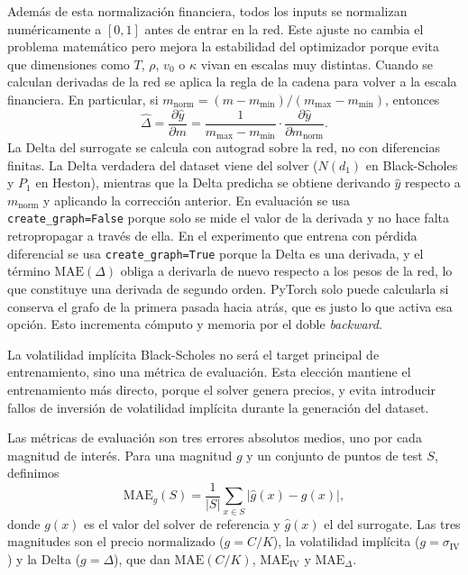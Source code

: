 \documentclass[11pt,a4paper]{article}
\newcommand{\param}[1]{\texttt{#1}}
\begin{document}
Además de esta normalización financiera, todos los inputs se normalizan numéricamente a $[0, 1]$ antes de entrar en la red. Este ajuste no cambia el problema matemático pero mejora la estabilidad del optimizador porque evita que dimensiones como $T$, $\rho$, $v_0$ o $\kappa$ vivan en escalas muy distintas. Cuando se calculan derivadas de la red se aplica la regla de la cadena para volver a la escala financiera. En particular, si $m_{\text{norm}} = (m - m_{\min}) / (m_{\max} - m_{\min})$, entonces
\begin{equation}
\hat{\Delta} = \frac{\partial \hat{y}}{\partial m} = \frac{1}{m_{\max} - m_{\min}} \cdot \frac{\partial \hat{y}}{\partial m_{\text{norm}}}.
\end{equation}
La Delta del surrogate se calcula con autograd sobre la red, no con diferencias finitas. La Delta verdadera del dataset viene del solver ($N(d_1)$ en Black-Scholes y $P_1$ en Heston), mientras que la Delta predicha se obtiene derivando $\hat{y}$ respecto a $m_{\text{norm}}$ y aplicando la corrección anterior. En evaluación se usa \param{create\_graph=False} porque solo se mide el valor de la derivada y no hace falta retropropagar a través de ella. En el experimento que entrena con pérdida diferencial se usa \param{create\_graph=True} porque la Delta es una derivada, y el término $\text{MAE}(\Delta)$ obliga a derivarla de nuevo respecto a los pesos de la red, lo que constituye una derivada de segundo orden. PyTorch solo puede calcularla si conserva el grafo de la primera pasada hacia atrás, que es justo lo que activa esa opción. Esto incrementa cómputo y memoria por el doble \emph{backward}.

La volatilidad implícita Black-Scholes no será el target principal de entrenamiento, sino una métrica de evaluación. Esta elección mantiene el entrenamiento más directo, porque el solver genera precios, y evita introducir fallos de inversión de volatilidad implícita durante la generación del dataset.

Las métricas de evaluación son tres errores absolutos medios, uno por cada magnitud de interés. Para una magnitud $g$ y un conjunto de puntos de test $S$, definimos
\begin{equation}
\text{MAE}_g(S) = \frac{1}{|S|} \sum_{x \in S} \bigl| \hat{g}(x) - g(x) \bigr|,
\label{eq:mae}
\end{equation}
donde $g(x)$ es el valor del solver de referencia y $\hat{g}(x)$ el del surrogate. Las tres magnitudes son el precio normalizado ($g = C/K$), la volatilidad implícita ($g = \sigma_{\text{IV}}$) y la Delta ($g = \Delta$), que dan $\text{MAE}(C/K)$, $\text{MAE}_{\text{IV}}$ y $\text{MAE}_{\Delta}$.
\end{document}
